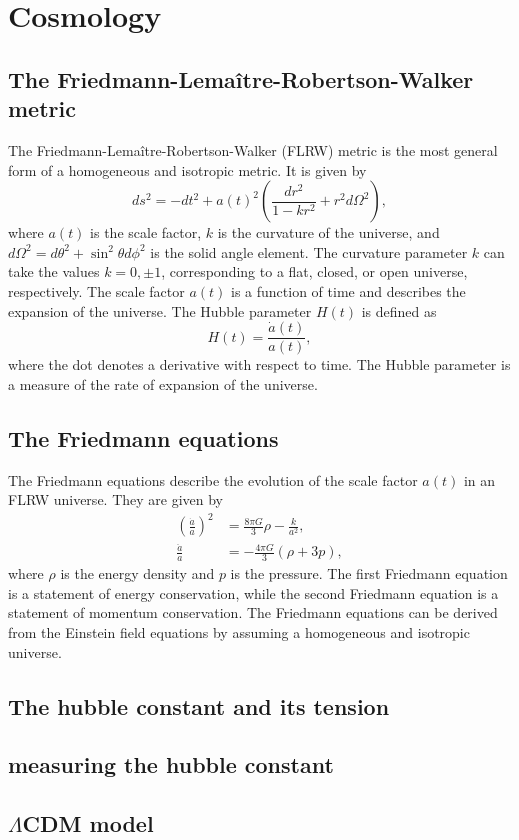 \chapter{Cosmology}

\section{The Friedmann-Lemaître-Robertson-Walker metric}

The Friedmann-Lemaître-Robertson-Walker (FLRW) metric is the most general form of a homogeneous and isotropic metric. It is given by
\begin{equation}
    ds^2 = -dt^2 + a(t)^2 \left( \frac{dr^2}{1 - kr^2} + r^2 d\Omega^2 \right),
\end{equation}
where $a(t)$ is the scale factor, $k$ is the curvature of the universe, and $d\Omega^2 = d\theta^2 + \sin^2\theta d\phi^2$ is the solid angle element. The curvature parameter $k$ can take the values $k = 0, \pm 1$, corresponding to a flat, closed, or open universe, respectively. The scale factor $a(t)$ is a function of time and describes the expansion of the universe. The Hubble parameter $H(t)$ is defined as
\begin{equation}
    H(t) = \frac{\dot{a}(t)}{a(t)},
\end{equation}
where the dot denotes a derivative with respect to time. The Hubble parameter is a measure of the rate of expansion of the universe.

\section{The Friedmann equations}

The Friedmann equations describe the evolution of the scale factor $a(t)$ in an FLRW universe. They are given by
\begin{align}\label{eq:friedmann}
    \left( \frac{\dot{a}}{a} \right)^2 & = \frac{8\pi G}{3} \rho - \frac{k}{a^2}, \\
    \frac{\ddot{a}}{a}                 & = -\frac{4\pi G}{3} (\rho + 3p),
\end{align}
where $\rho$ is the energy density and $p$ is the pressure. The first Friedmann equation is a statement of energy conservation, while the second Friedmann equation is a statement of momentum conservation. The Friedmann equations can be derived from the Einstein field equations by assuming a homogeneous and isotropic universe.

\section{The hubble constant and its tension}


\section{measuring the hubble constant}

\section{\texorpdfstring{$\Lambda$CDM model}{ΛCDM model}}

